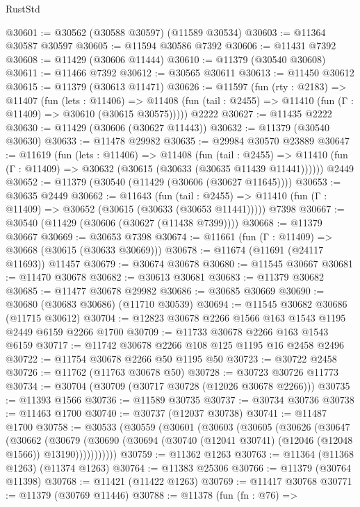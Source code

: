 \begin{lexlean}{RustStd}
\begin{coremodule}
@30601 := @30562 (@30588 @30597) (@11589 @30534)
@30603 := @11364 @30587 @30597
@30605 := @11594 @30586 @7392
@30606 := @11431 @7392
@30608 := @11429 (@30606 @11444)
@30610 := @11379 (@30540 @30608)
@30611 := @11466 @7392
@30612 := @30565 @30611
@30613 := @11450 @30612
@30615 := @11379 (@30613 @11471)
@30626 := @11597
    (fun (rty : @2183) =>
    @11407
      (fun (lets : @11406) =>
      @11408 (fun (tail : @2455) => @11410 (fun (Γ : @11409) => @30610 (@30615 @30575)))))
    @2222
@30627 := @11435 @2222
@30630 := @11429 (@30606 (@30627 @11443))
@30632 := @11379 (@30540 @30630)
@30633 := @11478 @29982
@30635 := @29984 @30570 @23889
@30647 := @11619
    (fun (lets : @11406) =>
    @11408
      (fun (tail : @2455) =>
      @11410 (fun (Γ : @11409) => @30632 (@30615 (@30633 (@30635 @11439 @11441))))))
    @2449
@30652 := @11379 (@30540 (@11429 (@30606 (@30627 @11645))))
@30653 := @30635 @2449
@30662 := @11643
    (fun (tail : @2455) => @11410 (fun (Γ : @11409) => @30652 (@30615 (@30633 (@30653 @11441)))))
    @7398
@30667 := @30540 (@11429 (@30606 (@30627 (@11438 @7399))))
@30668 := @11379 @30667
@30669 := @30653 @7398
@30674 := @11661 (fun (Γ : @11409) => @30668 (@30615 (@30633 @30669)))
@30678 := @11674 (@11691 (@24117 @11693)) @11457
@30679 := @30674 @30678
@30680 := @11545 @30667
@30681 := @11470 @30678
@30682 := @30613 @30681
@30683 := @11379 @30682
@30685 := @11477 @30678 @29982
@30686 := @30685 @30669
@30690 := @30680 (@30683 @30686) (@11710 @30539)
@30694 := @11545 @30682 @30686 (@11715 @30612)
@30704 := @12823 @30678 @2266 @1566 @163 @1543 @1195 @2449 @6159 @2266 @1700
@30709 := @11733 @30678 @2266 @163 @1543 @6159
@30717 := @11742 @30678 @2266 @108 @125 @1195 @16 @2458 @2496
@30722 := @11754 @30678 @2266 @50 @1195 @50
@30723 := @30722 @2458
@30726 := @11762 (@11763 @30678 @50)
@30728 := @30723 @30726 @11773
@30734 := @30704 (@30709 (@30717 @30728 (@12026 @30678 @2266)))
@30735 := @11393 @1566
@30736 := @11589 @30735
@30737 := @30734 @30736
@30738 := @11463 @1700
@30740 := @30737 (@12037 @30738)
@30741 := @11487 @1700
@30758 := @30533
    (@30559
      (@30601
        (@30603
          (@30605
            (@30626
              (@30647
                (@30662
                  (@30679
                    (@30690
                      (@30694 (@30740 (@12041 @30741) (@12046 (@12048 @1566)) @13190)))))))))))
@30759 := @11362 @1263
@30763 := @11364 (@11368 @1263) (@11374 @1263)
@30764 := @11383 @25306
@30766 := @11379 (@30764 @11398)
@30768 := @11421 (@11422 @1263)
@30769 := @11417 @30768
@30771 := @11379 (@30769 @11446)
@30788 := @11378
    (fun (fn : @76) =>

\end{coremodule}
\end{lexlean}
